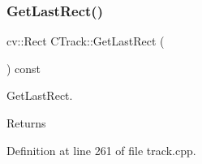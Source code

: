 \subsubsection{\texorpdfstring{Get\+Last\+Rect()}{GetLastRect()}}
{\footnotesize\ttfamily cv\+::\+Rect C\+Track\+::\+Get\+Last\+Rect (\begin{DoxyParamCaption}{ }\end{DoxyParamCaption}) const}



Get\+Last\+Rect. 

\begin{DoxyReturn}{Returns}

\end{DoxyReturn}


Definition at line 261 of file track.\+cpp.


